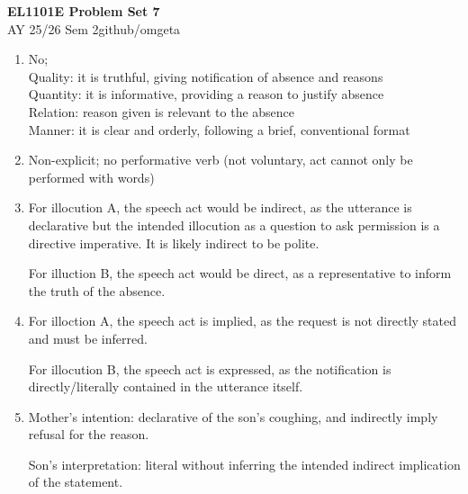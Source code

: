 \documentclass[12pt, a4paper]{article}
\newcommand{\mytitle}{EL1101E Problem Set 7}
\newcommand{\myauthor}{github/omgeta}
\newcommand{\mydate}{AY 25/26 Sem 2}
\begin{document}
\raggedright
\footnotesize
\begin{center}
{\normalsize{\textbf{\mytitle}}} \\
{\footnotesize{\mydate\hspace{2pt}\textemdash\hspace{2pt}\myauthor}}
\end{center}
\begin{enumerate}
  \item No;\\ 
    Quality: it is truthful, giving notification of absence and reasons \\ 
    Quantity: it is informative, providing a reason to justify absence\\ 
    Relation: reason given is relevant to the absence \\ 
    Manner: it is clear and orderly, following a brief, conventional format

  \item Non-explicit; no performative verb (not voluntary, act cannot only be performed with words)

  \item For illocution A, the speech act would be indirect, as the utterance is declarative but the intended illocution as a question to ask permission is a directive imperative. It is likely indirect to be polite. 

    For illuction B, the speech act would be direct, as a representative to inform the truth of the absence.

  \item For illoction A, the speech act is implied, as the request is not directly stated and must be inferred. 

    For illocution B, the speech act is expressed, as the notification is directly/literally contained in the utterance itself. 

  \item Mother's intention: declarative of the son's coughing, and indirectly imply refusal for the reason.

    Son's interpretation: literal without inferring the intended indirect implication of the statement.
\end{enumerate}
\end{document}
